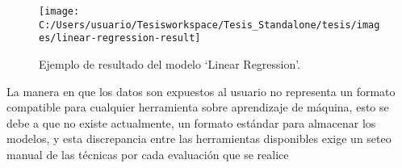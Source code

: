 \begin{figure}[H]
\begin{centering}
\texttt{[image: C:/Users/usuario/Tesisworkspace/Tesis\_Standalone/tesis/images/linear-regression-result]}
\par\end{centering}

\caption{Ejemplo de resultado del modelo ‘Linear Regression’. \label{fig:linear-regression-result}}
\end{figure}


La manera en que los datos son expuestos al usuario no representa
un formato compatible para cualquier herramienta sobre aprendizaje
de máquina, esto se debe a que no existe actualmente, un formato estándar
para almacenar los modelos, y esta discrepancia entre las herramientas
disponibles exige un seteo manual de las técnicas por cada evaluación
que se realice
